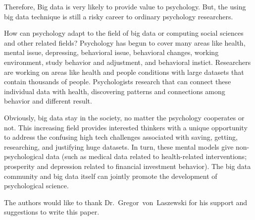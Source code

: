 Therefore, Big data is very likely to provide value to psychology.
 But, the using big data technique is still a risky career to
 ordinary psychology researchers.

How can psychology adapt to the field of big data or computing 
social sciences and other related fields? Psychology has begun to 
cover many areas like health, mental issue, depressing, behavioral
 issue, behavioral changes, working environment, study behavior 
and adjustment, and behavioral instict. Researchers are working on 
areas like health and people conditions with large datasets that
 contain thousands of people. Psychologists research that 
can connect these individual data with health, 
discovering patterns and connections among behavior and different 
result.

Obviously, big data stay in the society, no matter the psychology 
cooperates or not. This increasing field provides interested 
thinkers with a unique opportunity to address the confusing 
high tech challenges associated with 
saving, getting, researching, and justifying huge datasets. 
In turn, these mental models give
 non-psychological data (such as medical data related to 
health-related interventions; prosperity and depression related to
 financial investment behavior). The big data community and big 
data itself can jointly promote the development of psychological 
science.


\begin{acks}

  The authors would like to thank Dr.~Gregor~von~Laszewski for his
  support and suggestions to write this paper.

\end{acks}



 

